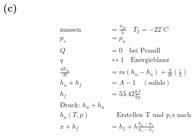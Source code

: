 

\subsection*{(c)}

\begin{align*}
    \text{massen} &= \frac{u_{fg}}{h} \quad T_2 = -22^\circ C \\
    p_s &= p_u \\
    \dot{Q} &= 0 \quad \text{bei Prandl} \\
    q &\leftrightarrow 1 \quad \text{Energieblanz} \\
    \frac{d\dot{E}_K}{dt} &= \dot{m} (h_u - h_a) + \frac{d}{dt} \left( \frac{c}{2} \right) \\
    h_u + h_f &= A - 1 \quad (\text{solids}) \\
    h_f &= 53.42 \frac{kJ}{kg} \\
    \text{Druck: } h_u + h_a \\
    h_a (T, p) &\quad \text{Erstellen T und p_s nach} \\
    x + h_f &= h_f + h \frac{h_a - h_f}{h_s - h_f}
\end{align*}